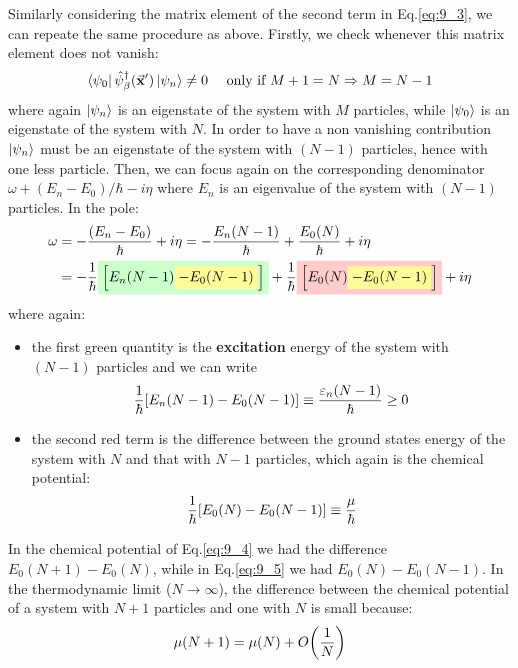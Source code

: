 \documentclass[../main/main.tex]{subfiles}
\begin{document}
Similarly considering the matrix element of the second term in Eq.\eqref{eq:9_3}, we can repeate the same procedure as above. Firstly, we check whenever this matrix element does not vanish:
\begin{equation*}
  \bra{\psi _0} \hat{\psi }_{\beta } ^\dag (\va{x}') \ket{\psi _n} \neq 0 \quad \text{ only if } M+1 =N \Rightarrow M = N-1
\end{equation*}
where again \( \ket{\psi _n} \) is an eigenstate of the system with \( M \) particles, while \( \ket{\psi _0} \) is an eigenstate of the system with \( N \).
In order to have a non vanishing contribution \( \ket{\psi _n}  \) must be an eigenstate of the system with \( (N-1) \) particles, hence with one less particle.
Then,  we can focus again on the corresponding denominator \( \omega + (E_n-E_0)/\hbar - i \eta  \) where \( E_n \) is an eigenvalue of the system with \( (N-1) \) particles.
In the pole:
\begin{equation}
\begin{split}
\omega   &= - \frac{(E_n - E_0)}{\hbar } + i \eta  =
- \frac{E_n (N-1)}{\hbar } + \frac{E_0 (N)}{\hbar } + i \eta  \\
&= - \frac{1}{\hbar } \mathcolorbox{green!20}{ \qty[E_n (N-1) \mathcolorbox{yellow!40}{- E_0 (N-1)}] }
+ \frac{1}{\hbar } \mathcolorbox{red!20}{ \qty[E_0 (N) \mathcolorbox{yellow!40}{- E_0 (N-1)}] } + i \eta
\end{split}
\label{eq:9_5}
\end{equation}
where again:
\begin{itemize}
\item the first green quantity is the \textbf{excitation} energy of the system with \( (N-1) \) particles and we can write
\begin{equation*}
  \frac{1}{\hbar } \qty[E_n (N-1) - E_0 (N-1)]  \equiv  \frac{\varepsilon _n (N-1)}{\hbar } \ge 0
\end{equation*}
\item the second red term is the difference between the ground states energy of the system with \( N \) and that with \( N-1 \) particles, which again is the chemical potential:
\begin{equation*}
  \frac{1}{\hbar }\qty[E_0 (N) - E_0 (N-1)] \equiv \frac{\mu }{\hbar }
\end{equation*}
\end{itemize}

\begin{remark}
In the chemical potential of Eq.\eqref{eq:9_4} we had the difference \( E_0(N+1)-E_0 (N) \), while in Eq.\eqref{eq:9_5} we had \( E_0(N)-E_0 (N-1)  \).
In the thermodynamic limit (\( N \rightarrow \infty  \)), the difference between the chemical potential of a system with \( N+1 \) particles and one with \( N \) is small because:
\begin{equation*}
  \mu (N+1) = \mu (N) + O \qty(\frac{1}{N})
\end{equation*}
\end{remark}
\end{document}

